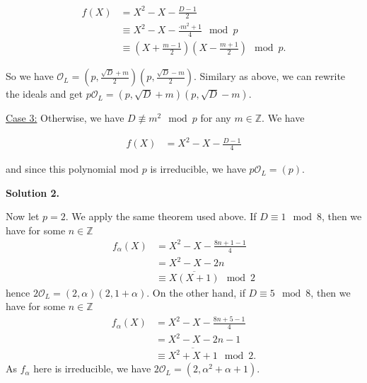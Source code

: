 \documentclass[a4paper]{article}
\theoremstyle{definition}
\begin{document}
\begin{align}
    f(X) &= X^2 - X - \frac{D - 1}{2} \\
    &\equiv X^2 - X - \frac{ \cdot m^2 + 1}{4} \mod{p}\\
    &\equiv (X + \frac{m - 1}{2})(X - \frac{m + 1}{2}) \mod{p} \text{.}
\end{align}

\noindent So we have \(\mathcal{O}_L = (p, \frac{\sqrt{D}+m}{2})(p, \frac{\sqrt{D}-m}{2})\). Similary as above, we can rewrite the ideals and get \(p\mathcal{O}_L = (p, \sqrt{D}+m)(p, \sqrt{D}-m)\).

\bigskip

\noindent \underline{Case 3:} Otherwise, we have \(D \not\equiv m^2 \mod{p}\) for any \(m \in \mathbb{Z}\). We have

\begin{align}
    f(X) &= X^2 - X - \frac{D - 1}{4}
\end{align}

and since this polynomial mod \(p\) is irreducible, we have \(p\mathcal{O}_L = (p)\).

\bigskip

\noindent \textbf{Solution 2.}

\noindent Now let \(p = 2\). We apply the same theorem used above. If \(D \equiv 1 \mod{8}\), then we have for some \(n \in \mathbb{Z}\)
\begin{align}
    f_\alpha(X) &= X^2 - X - \frac{8n + 1 - 1}{4} \\
    &= X^2 - X - 2n \\
    &\equiv \overline{X(X +  1)} \mod{2}
\end{align}
hence \(2\mathcal{O}_L = (2, \alpha) (2, 1 + \alpha)\). On the other hand, if \(D \equiv 5 \mod{8}\), then we have for some \(n \in \mathbb{Z}\)
\begin{align}
    f_\alpha(X) &= X^2 - X - \frac{8n + 5 - 1}{4} \\
    &= X^2 - X - 2n - 1 \\
    &\equiv \overline{X^2 + X + 1} \mod{2} \text{.}
\end{align}
As \(f_\alpha\) here is irreducible, we have \(2 \mathcal{O}_L = (2, \alpha^2 + \alpha + 1)\).
\end{document}
